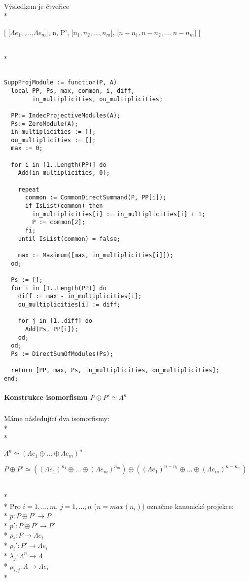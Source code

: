 \documentclass[7pt]{article}
\begin{document}
     \paragraph{} Výsledkem je čtveřice \\*
       \centerline{
         [ [$\Lambda{e_1},$,...,$\Lambda{e_m}$], n, P', [$n_1,n_2,...,n_m$], [$n-n_1,n-n_2,...,n-n_m$] ]
       }\\*
\begin{verbatim}

SuppProjModule := function(P, A)
  local PP, Ps, max, common, i, diff,
        in_multiplicities, ou_multiplicities;

  PP:= IndecProjectiveModules(A);
  Ps:= ZeroModule(A);
  in_multiplicities := [];
  ou_multiplicities := [];
  max := 0;

  for i in [1..Length(PP)] do
    Add(in_multiplicities, 0);

    repeat
      common := CommonDirectSummand(P, PP[i]);
      if IsList(common) then
        in_multiplicities[i] := in_multiplicities[i] + 1;
        P := common[2];
      fi;
    until IsList(common) = false;

    max := Maximum([max, in_multiplicities[i]]);
  od;

  Ps := [];
  for i in [1..Length(PP)] do
    diff := max - in_multiplicities[i];
    ou_multiplicities[i] := diff;

    for j in [1..diff] do
      Add(Ps, PP[i]);
    od;
  od;
  Ps := DirectSumOfModules(Ps);

  return [PP, max, Ps, in_multiplicities, ou_multiplicities];
end;
 \end{verbatim}
  
     \paragraph{Konstrukce isomorfismu $P\oplus P'\simeq\Lambda^n$}
        \subparagraph{}
        Máme následující dva isomorfismy: \\*\\*
          \centerline{$\Lambda^n \simeq (\Lambda e_1 \oplus ... \oplus \Lambda e_m)^n $}    
          \centerline{$P\oplus P' 
            \simeq 
            ((\Lambda e_1)^{n_1}\oplus ... \oplus(\Lambda e_m)^{n_m})
            \oplus
            ((\Lambda e_1)^{n-n_1}\oplus ... \oplus(\Lambda e_m)^{n-n_m})
          $}          
          \\*\\*  
          Pro $i=1,...,m$, $j=1,...,n$ ($n=max(n_i)$) označme kanonické projekce:   \\*
          $p:P \oplus P' \rightarrow P$ \\*
          $p':P \oplus P' \rightarrow P'$ \\*
          $\rho_i:P \rightarrow \Lambda e_i$ \\*
          $\rho_i':P' \rightarrow \Lambda e_i$ \\*
          $\lambda_j:\Lambda^n \rightarrow \Lambda$ \\*
          $\mu_{i,j}: \Lambda \rightarrow \Lambda e_i$ \\*
          
\end{document}
